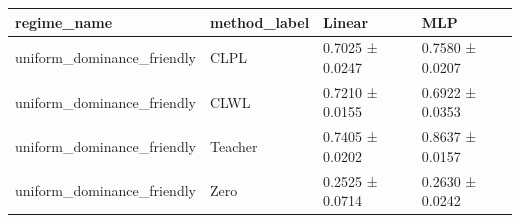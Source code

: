 \begin{tabular}{llll}
\toprule
regime_name & method_label & Linear & MLP \\
\midrule
uniform_dominance_friendly & CLPL & 0.7025 ± 0.0247 & 0.7580 ± 0.0207 \\
uniform_dominance_friendly & CLWL & 0.7210 ± 0.0155 & 0.6922 ± 0.0353 \\
uniform_dominance_friendly & Teacher & 0.7405 ± 0.0202 & 0.8637 ± 0.0157 \\
uniform_dominance_friendly & Zero & 0.2525 ± 0.0714 & 0.2630 ± 0.0242 \\
\bottomrule
\end{tabular}

